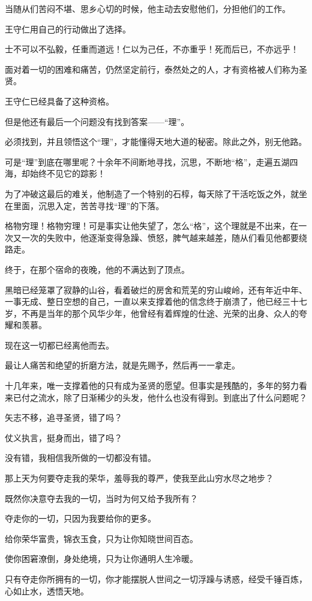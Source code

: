 \begin{multicols}{\theparacolNo}
		当随从们苦闷不堪、思乡心切的时候，他主动去安慰他们，分担他们的工作。

		王守仁用自己的行动做出了选择。

		士不可以不弘毅，任重而道远！仁以为己任，不亦重乎！死而后已，不亦远乎！

		面对着一切的困难和痛苦，仍然坚定前行，泰然处之的人，才有资格被人们称为圣贤。

		王守仁已经具备了这种资格。

		但是他还有最后一个问题没有找到答案——“理”。

		必须找到，并且领悟这个“理”，才能懂得天地大道的秘密。除此之外，别无他路。

		可是“理”到底在哪里呢？十余年不间断地寻找，沉思，不断地“格”，走遍五湖四海，却始终不见它的踪影！

		为了冲破这最后的难关，他制造了一个特别的石椁，每天除了干活吃饭之外，就坐在里面，沉思入定，苦苦寻找“理”的下落。

		格物穷理！格物穷理！可是事实让他失望了，怎么“格”，这个理就是不出来，在一次又一次的失败中，他逐渐变得急躁、愤怒，脾气越来越差，随从们看见他都要绕路走。

		终于，在那个宿命的夜晚，他的不满达到了顶点。

		黑暗已经笼罩了寂静的山谷，看着破烂的房舍和荒芜的穷山峻岭，还有年近中年、一事无成、整日空想的自己，一直以来支撑着他的信念终于崩溃了，他已经三十七岁，不再是当年的那个风华少年，他曾经有着辉煌的仕途、光荣的出身、众人的夸耀和羡慕。

		现在这一切都已经离他而去。

		最让人痛苦和绝望的折磨方法，就是先赐予，然后再一一拿走。

		十几年来，唯一支撑着他的只有成为圣贤的愿望。但事实是残酷的，多年的努力看来已付之流水，除了日渐稀少的头发，他什么也没有得到。到底出了什么问题呢？

		矢志不移，追寻圣贤，错了吗？

		仗义执言，挺身而出，错了吗？

		没有错，我相信我所做的一切都没有错。

		那上天为何要夺走我的荣华，羞辱我的尊严，使我至此山穷水尽之地步？

		既然你决意夺去我的一切，当时为何又给予我所有？

		夺走你的一切，只因为我要给你的更多。

		给你荣华富贵，锦衣玉食，只为让你知晓世间百态。

		使你困窘潦倒，身处绝境，只为让你通明人生冷暖。

		只有夺走你所拥有的一切，你才能摆脱人世间之一切浮躁与诱惑，经受千锤百炼，心如止水，透悟天地。


\end{multicols}
